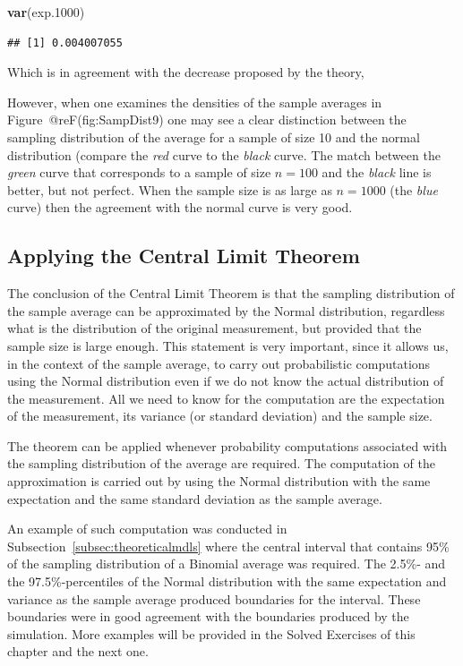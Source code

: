 \documentclass[]{krantz}
\makeatletter
\newenvironment{Shaded}{\begin{snugshade}}{\end{snugshade}}
\newcommand{\KeywordTok}[1]{\textcolor[rgb]{0.13,0.29,0.53}{\textbf{#1}}}
\newcommand{\DecValTok}[1]{\textcolor[rgb]{0.00,0.00,0.81}{#1}}
\newcommand{\NormalTok}[1]{#1}
\newenvironment{kframe}{%
\medskip{}
\setlength{\fboxsep}{.8em}
 \def\at@end@of@kframe{}%
 \ifinner\ifhmode%
  \def\at@end@of@kframe{\end{minipage}}%
  \begin{minipage}{\columnwidth}%
 \fi\fi%
 \def\FrameCommand##1{\hskip\@totalleftmargin \hskip-\fboxsep
 \colorbox{shadecolor}{##1}\hskip-\fboxsep
     \hskip-\linewidth \hskip-\@totalleftmargin \hskip\columnwidth}%
 \MakeFramed {\advance\hsize-\width
   \@totalleftmargin\z@ \linewidth\hsize
   \@setminipage}}%
 {\par\unskip\endMakeFramed%
 \at@end@of@kframe}
\renewenvironment{Shaded}{\begin{kframe}}{\end{kframe}}
\theoremstyle{definition}
\theoremstyle{definition}
\theoremstyle{definition}
\theoremstyle{remark}
\makeatother
\begin{document}
\begin{Shaded}
\begin{Highlighting}[]
\KeywordTok{var}\NormalTok{(exp.}\DecValTok{1000}\NormalTok{)}
\end{Highlighting}
\end{Shaded}

\begin{verbatim}
## [1] 0.004007055
\end{verbatim}

Which is in agreement with the decrease proposed by the theory,

However, when one examines the densities of the sample averages in
Figure~@reF(fig:SampDist9) one may see a clear distinction between the
sampling distribution of the average for a sample of size 10 and the
normal distribution (compare the \emph{red} curve to the \emph{black}
curve. The match between the \emph{green} curve that corresponds to a
sample of size \(n=100\) and the \emph{black} line is better, but not
perfect. When the sample size is as large as \(n=1000\) (the \emph{blue}
curve) then the agreement with the normal curve is very good.

\subsection{Applying the Central Limit
Theorem}\label{applying-the-central-limit-theorem}

The conclusion of the Central Limit Theorem is that the sampling
distribution of the sample average can be approximated by the Normal
distribution, regardless what is the distribution of the original
measurement, but provided that the sample size is large enough. This
statement is very important, since it allows us, in the context of the
sample average, to carry out probabilistic computations using the Normal
distribution even if we do not know the actual distribution of the
measurement. All we need to know for the computation are the expectation
of the measurement, its variance (or standard deviation) and the sample
size.

The theorem can be applied whenever probability computations associated
with the sampling distribution of the average are required. The
computation of the approximation is carried out by using the Normal
distribution with the same expectation and the same standard deviation
as the sample average.

An example of such computation was conducted in
Subsection~\ref{subsec:theoreticalmdls} where the central interval that
contains 95\% of the sampling distribution of a Binomial average was
required. The 2.5\%- and the 97.5\%-percentiles of the Normal
distribution with the same expectation and variance as the sample
average produced boundaries for the interval. These boundaries were in
good agreement with the boundaries produced by the simulation. More
examples will be provided in the Solved Exercises of this chapter and
the next one.
\end{document}
